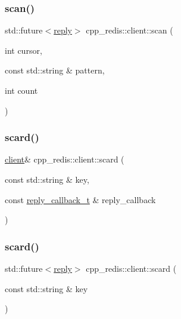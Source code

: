 \mbox{\label{classcpp__redis_1_1client_a847910b59d8c89acf37190f1b7e384ec}} 
\subsubsection{\texorpdfstring{scan()}{scan()}\hspace{0.1cm}{\footnotesize\ttfamily [2/2]}}
{\footnotesize\ttfamily std\+::future$<$\hyperlink{classcpp__redis_1_1reply}{reply}$>$ cpp\+\_\+redis\+::client\+::scan (\begin{DoxyParamCaption}\item[{int}]{cursor,  }\item[{const std\+::string \&}]{pattern,  }\item[{int}]{count }\end{DoxyParamCaption})}

\mbox{\label{classcpp__redis_1_1client_a4be40b061ee915a236218e5e2fd76206}} 
\subsubsection{\texorpdfstring{scard()}{scard()}\hspace{0.1cm}{\footnotesize\ttfamily [1/2]}}
{\footnotesize\ttfamily \hyperlink{classcpp__redis_1_1client}{client}\& cpp\+\_\+redis\+::client\+::scard (\begin{DoxyParamCaption}\item[{const std\+::string \&}]{key,  }\item[{const \hyperlink{classcpp__redis_1_1client_a061a1140d36d2eaeda82b09a0bb3f9f2}{reply\+\_\+callback\+\_\+t} \&}]{reply\+\_\+callback }\end{DoxyParamCaption})}

\mbox{\label{classcpp__redis_1_1client_a089148ca908f563e7b73649aac3bd01e}} 
\subsubsection{\texorpdfstring{scard()}{scard()}\hspace{0.1cm}{\footnotesize\ttfamily [2/2]}}
{\footnotesize\ttfamily std\+::future$<$\hyperlink{classcpp__redis_1_1reply}{reply}$>$ cpp\+\_\+redis\+::client\+::scard (\begin{DoxyParamCaption}\item[{const std\+::string \&}]{key }\end{DoxyParamCaption})}

